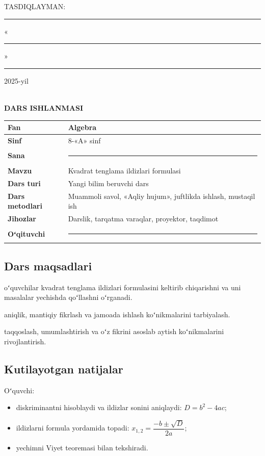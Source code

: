 \documentclass[11pt,a4paper]{article}
\newcommand\malumot[2]{\textbf{#1} & #2 \\ \hline}
\begin{document}
\begin{center}
  {\sffamily\small\color{dars} TASDIQLAYMAN: \rule{3cm}{0.4pt} \quad «\rule{0.8cm}{0.4pt}» \rule{2.5cm}{0.4pt} 2025-yil}\\[1em]
  {\sffamily\LARGE\bfseries\color{dars} DARS ISHLANMASI}
\end{center}

\vspace{0.5em}
\noindent
\begin{tabularx}{\linewidth}{|>{}p{4.2cm}|L|}
  \hline
  \malumot{Fan}{Algebra}
  \malumot{Sinf}{8-«A» sinf}
  \malumot{Sana}{\rule{3cm}{0.4pt}}
  \malumot{Mavzu}{Kvadrat tenglama ildizlari formulasi}
  \malumot{Dars turi}{Yangi bilim beruvchi dars}
  \malumot{Dars metodlari}{Muammoli savol, «Aqliy hujum», juftlikda ishlash, mustaqil ish}
  \malumot{Jihozlar}{Darslik, tarqatma varaqlar, proyektor, taqdimot}
  \malumot{Oʻqituvchi}{\rule{5cm}{0.4pt}}
\end{tabularx}

\subsection*{\color{dars}Dars maqsadlari}
\begin{description}[leftmargin=0pt]
  \item[Taʼlimiy:] oʻquvchilar kvadrat tenglama ildizlari formulasini
    keltirib chiqarishni va uni masalalar yechishda qoʻllashni oʻrganadi.
  \item[Tarbiyaviy:] aniqlik, mantiqiy fikrlash va jamoada ishlash
    koʻnikmalarini tarbiyalash.
  \item[Rivojlantiruvchi:] taqqoslash, umumlashtirish va oʻz fikrini asoslab
    aytish koʻnikmalarini rivojlantirish.
\end{description}

\subsection*{\color{dars}Kutilayotgan natijalar}
Oʻquvchi:
\begin{itemize}
  \item diskriminantni hisoblaydi va ildizlar sonini aniqlaydi:
    $D = b^2 - 4ac$;
  \item ildizlarni formula yordamida topadi:
    $x_{1,2} = \dfrac{-b \pm \sqrt{D}}{2a}$;
  \item yechimni Viyet teoremasi bilan tekshiradi.
\end{itemize}
\end{document}
